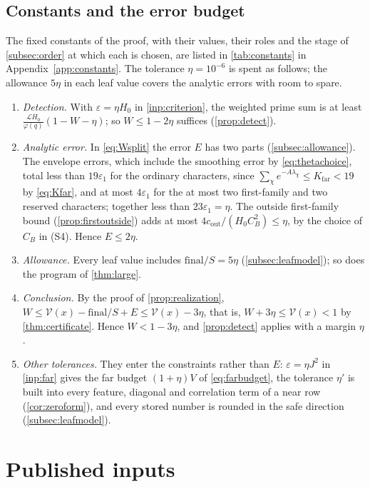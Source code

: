 \documentclass[11pt]{amsart}
\numberwithin{equation}{section}
\theoremstyle{plain}
\theoremstyle{definition}
\theoremstyle{remark}
\newcommand{\LL}{\mathcal{L}}
\newcommand{\eps}{\varepsilon}
\newcommand{\1}{\mathbf{1}}
\begin{document}
\subsection{Constants and the error budget}\label{subsec:budget}
The fixed constants of the proof, with their values, their roles and the stage of
\cref{subsec:order} at which each is chosen, are listed in \cref{tab:constants} in
Appendix~\ref{app:constants}. The tolerance $\eta=10^{-6}$ is spent as follows; the allowance $5\eta$ in each leaf value covers
the analytic errors with room to spare.
\begin{enumerate}[(1)]
  \item \emph{Detection.} With $\eps=\eta H_0$ in \cref{inp:criterion}, the weighted prime sum is at
    least $\frac{\LL H_0}{\varphi(q)}(1-W-\eta)$; so $W\le1-2\eta$ suffices (\cref{prop:detect}).
  \item \emph{Analytic error.} In \eqref{eq:Wsplit} the error $E$ has two parts
    (\cref{subsec:allowance}). The envelope errors, which include the smoothing error by
    \eqref{eq:thetachoice}, total less than $19\eps_1$ for the ordinary characters, since
    $\sum_\chi e^{-A\lambda_\chi}\le K_{\mathrm{far}}<19$ by \eqref{eq:Kfar}, and at most $4\eps_1$ for
    the at most two first-family and two reserved characters; together less than $23\eps_1=\eta$.
    The outside first-family bound (\cref{prop:firstoutside}) adds at most
    $4c_{\mathrm{out}}/(H_0C_B^2)\le\eta$, by the choice of $C_B$ in (S4). Hence $E\le2\eta$.
  \item \emph{Allowance.} Every leaf value includes $\mathrm{final}/S=5\eta$
    (\cref{subsec:leafmodel}); so does the program of \cref{thm:large}.
  \item \emph{Conclusion.} By the proof of \cref{prop:realization},
    $W\le\mathcal V(x)-\mathrm{final}/S+E\le\mathcal V(x)-3\eta$, that is, $W+3\eta\le\mathcal V(x)<1$
    by \cref{thm:certificate}. Hence $W<1-3\eta$, and \cref{prop:detect} applies with a margin $\eta$.
  \item \emph{Other tolerances.} They enter the constraints rather than $E$: $\eps=\eta J^2$ in
    \cref{inp:far} gives the far budget $(1+\eta)V$ of \eqref{eq:farbudget}, the tolerance $\eta'$ is
    built into every feature, diagonal and correlation term of a near row (\cref{cor:zeroform}), and every
    stored number is rounded in the safe direction (\cref{subsec:leafmodel}).
\end{enumerate}

\section{Published inputs}\label{sec:inputs}
\end{document}
